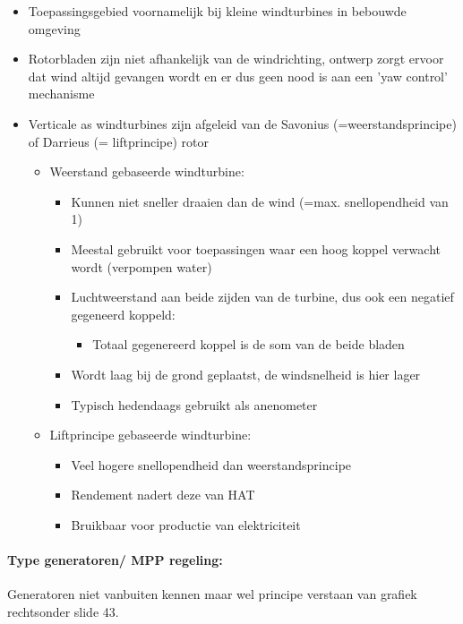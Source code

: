 \documentclass[12pt]{article}
\begin{document}
\begin{itemize}
    \item Toepassingsgebied voornamelijk bij kleine windturbines in bebouwde omgeving
    \item Rotorbladen zijn niet afhankelijk van de windrichting, ontwerp zorgt ervoor dat wind altijd gevangen wordt en er dus geen nood is aan een 'yaw control' mechanisme
    \item Verticale as windturbines zijn afgeleid van de Savonius (=weerstandsprincipe) of Darrieus (= liftprincipe) rotor\begin{itemize}
        \item Weerstand gebaseerde windturbine:\begin{itemize}
            \item Kunnen niet sneller draaien dan de wind (=max. snellopendheid van 1)
            \item Meestal gebruikt voor toepassingen waar een hoog koppel verwacht wordt (verpompen water)
            \item Luchtweerstand aan beide zijden van de turbine, dus ook een negatief gegeneerd koppeld:\begin{itemize}
                \item Totaal gegenereerd koppel is de som van de beide bladen
            \end{itemize}
            \item Wordt laag bij de grond geplaatst, de windsnelheid is hier lager
            \item Typisch hedendaags gebruikt als anenometer
        \end{itemize}
        \item Liftprincipe gebaseerde windturbine:\begin{itemize}
            \item Veel hogere snellopendheid dan weerstandsprincipe
            \item Rendement nadert deze van HAT
            \item Bruikbaar voor productie van elektriciteit
        \end{itemize}
    \end{itemize}
\end{itemize}
\paragraph{Type generatoren/ MPP regeling:}
Generatoren niet vanbuiten kennen maar wel principe verstaan van grafiek rechtsonder slide 43.
\end{document}
